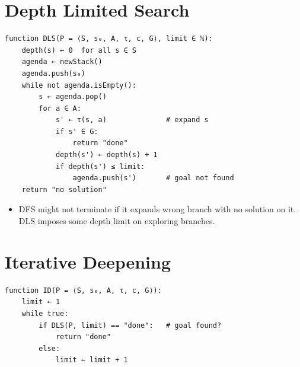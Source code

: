 \documentclass[12pt, a4paper]{article}
\begin{document}
\section{Depth Limited Search}
\begin{algorithm}[H]
\end{algorithm}
\begin{Verbatim}
function DLS(P = ⟨S, s₀, A, τ, c, G⟩, limit ∈ ℕ):
    depth(s) ← 0  for all s ∈ S
    agenda ← newStack()
    agenda.push(s₀)
    while not agenda.isEmpty():
        s ← agenda.pop()
        for a ∈ A:
            s' ← τ(s, a)              # expand s
            if s' ∈ G:
                return "done"
            depth(s') ← depth(s) + 1
            if depth(s') ≤ limit:
                agenda.push(s')       # goal not found
    return "no solution"
\end{Verbatim}

\begin{itemize}
    \item DFS might not terminate if it expands wrong branch with no solution on it.
DLS imposes some depth limit on exploring branches.
\end{itemize}

\newpage

\section{Iterative Deepening}
\begin{algorithm}[H]

\end{algorithm}
\begin{Verbatim}
function ID(P = ⟨S, s₀, A, τ, c, G⟩):
    limit ← 1
    while true:
        if DLS(P, limit) == "done":   # goal found?
            return "done"
        else:
            limit ← limit + 1
\end{Verbatim}
\end{document}
